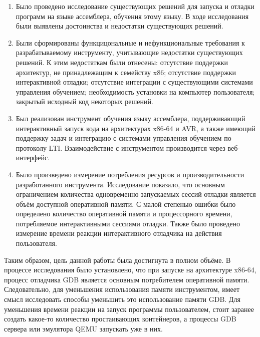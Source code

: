 \documentclass[a4paper,article,14pt]{extarticle}
\begin{document}
\begin{enumerate}
    \item Было проведено исследование существующих решений для запуска и отладки программ на языке ассемблера, обучения этому языку. В ходе исследования были выявлены достоинства и недостатки существующих решений.
    \item Были сформированы функцицональные и нефункциональные требования к разрабатываемому инструменту, учитывающие недостатки существующих решений. К этим недостаткам были отнесены: отсутствие поддержки архитектур, не принадлежащим к семейству x86; отсутствие поддержки интерактивной отладки; отсутствие интеграции с существующими системами управления обучением; необходимость установки на компьютер пользователя; закрытый исходный код некоторых решений.
    \item Был реализован инструмент обучения языку ассемблера, поддерживающий интерактивный запуск кода на архитектурах x86-64 и AVR, а также имеющий поддержку задач и интеграцию с системами управления обучением по протоколу LTI. Взаимодействие с инструментом производится через веб-интерфейс.
    \item Было произведено измерение потребления ресурсов и производительности разработанного инструмента. Исследование показало, что основным ограничением количества одновременно запускаемых сессий отладки является объём доступной оперативной памяти. С малой степенью ошибки было определено количество оперативной памяти и процессорного времени, потребляемое интерактивными сессиями отладки. Также было проведено измерение времени реакции интерактивного отладчика на действия пользователя.
\end{enumerate}

Таким образом, цель данной работы была достигнута в полном объёме. В процессе исследования было установлено, что при запуске на архитектуре x86-64, процесс отладчика GDB является основным потребителем оперативной памяти. Следовательно, для уменьшения использования памяти инструментом, имеет смысл исследовать способы уменьшить это использование памяти GDB. Для уменьшения времени реакции на запуск программы пользователем, стоит заранее создать какое-то количество простаивающих контейнеров, а процессы GDB сервера или эмулятора QEMU запускать уже в них.

\pagebreak
\begin{thebibliography}{1}
\printbibliography[heading=none]
\end{thebibliography}
\end{document}
